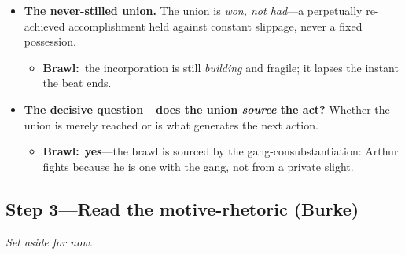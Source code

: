 \documentclass[11pt]{article}
\newcommand{\inb}{\textbf{Brawl:}~}
\begin{document}
\begin{itemize}
    \begin{itemize}\item \inb \textbf{genuine} with the gang (acting together makes consubstantial); a \textbf{counter}-union forms around the crowd backing Tommy.\end{itemize}
  \item \textbf{The never-stilled union.} The union is \emph{won, not had}---a perpetually re-achieved accomplishment held against constant slippage, never a fixed possession.
    \begin{itemize}\item \inb the incorporation is still \emph{building} and fragile; it lapses the instant the beat ends.\end{itemize}
  \item \textbf{The decisive question---does the union \emph{source} the act?} Whether the union is merely reached or is what generates the next action.
    \begin{itemize}\item \inb \textbf{yes}---the brawl is sourced by the gang-consubstantiation: Arthur fights because he is one with the gang, not from a private slight.\end{itemize}
\end{itemize}

\subsection*{Step 3---Read the motive-rhetoric (Burke)}
\noindent\emph{Set aside for now.}
\end{document}
